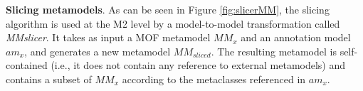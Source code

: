 \textbf{Slicing metamodels}. As can be seen in Figure \ref{fig:slicerMM}, the slicing algorithm is used at the M2 level by a model-to-model transformation called \textit{MMslicer}.
It takes as input a MOF metamodel $MM_x$ and an annotation model $am_x$, and generates a new metamodel $MM_{sliced}$.
The resulting metamodel is self-contained (i.e., it does not contain any reference to external metamodels)
and contains a subset of $MM_x$ according to the metaclasses referenced in $am_x$.

%

